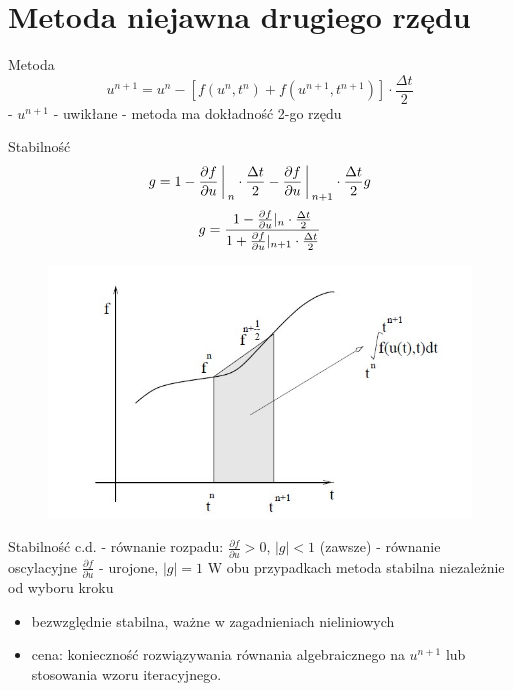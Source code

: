 \section{Metoda niejawna drugiego rzędu}
\begin{frame}{Metoda}
	$$u^{n+1} = u^n - [f(u^n,t^n)+f(u^{n+1},t^{n+1})]\cdot \frac{\Delta t}{2}$$
    \newline
    - $u^{n+1}$ - uwikłane
    \newline
    - metoda ma dokładność 2-go rzędu
\end{frame}
\begin{frame}{Stabilność}
	$$g = 1-\frac{\partial f}{\partial u}\bigg\arrowvert_n \cdot\frac{\Delta t}{2}-\frac{\partial f}{\partial u}\bigg\arrowvert_{n+1}\cdot \frac{\Delta t}{2} g$$
	$$g=\frac{1-\frac{\partial f}{\partial u}\arrowvert_n \cdot \frac{\Delta t}{2}}{1+\frac{\partial f}{\partial u}\arrowvert_{n+1} \cdot \frac{\Delta t}{2}}$$
    \begin{figure}
    	\includegraphics[height=0.55\textheight]{img/22/stabilnosc.jpg}
    \end{figure}
\end{frame}
\begin{frame}{Stabilność c.d.}
	- równanie rozpadu: $\frac{\partial f}{\partial u} > 0$, \quad $|g| < 1$ (zawsze)
    \newline
    - równanie oscylacyjne $\frac{\partial f}{\partial u}$ - urojone, $|g| = 1$
    \newline\newline
    W obu przypadkach metoda stabilna niezależnie od wyboru kroku
    \begin{itemize}
      \item bezwzględnie stabilna, ważne w zagadnieniach nieliniowych
      \item cena: konieczność rozwiązywania równania algebraicznego na $u^{n+1}$ lub stosowania wzoru iteracyjnego.
    \end{itemize}
\end{frame}
